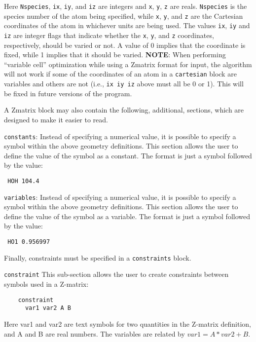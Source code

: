\begin{description}
Here \texttt{Nspecies}, \texttt{ix}, \texttt{iy}, and \texttt{iz} are
integers and \texttt{x}, \texttt{y}, \texttt{z} are
reals. \texttt{Nspecies} is the species number of the atom being
specified, while \texttt{x}, \texttt{y}, and \texttt{z} are the
Cartesian coordinates of the atom in whichever units are being
used. The values \texttt{ix}, \texttt{iy} and \texttt{iz} are integer
flags that indicate whether the \texttt{x}, \texttt{y}, and \texttt{z}
coordinates, respectively, should be varied or not. A value of 0
implies that the coordinate is fixed, while 1 implies that it should
be varied.  \textbf{NOTE}: When performing ``variable cell''
optimization while using a Zmatrix format for input, the algorithm
will not work if some of the coordinates of an atom in a
\texttt{cartesian} block are variables and others are not (i.e.,
\texttt{ix iy iz} above must all be 0 or 1). This will be fixed in
future versions of the program.

A Zmatrix block may also contain the following, additional, sections, which
are designed to make it easier to read.

\item \texttt{constants}: Instead of specifying a numerical value, it
  is possible to specify a symbol within the above geometry
  definitions. This section allows the user to define the value of the
  symbol as a constant. The format is just a symbol followed by the
  value:

\noindent\texttt{      HOH 104.4}

\item \texttt{variables}: Instead of specifying a numerical value, it
  is possible to specify a symbol within the above geometry
  definitions. This section allows the user to define the value of the
  symbol as a variable. The format is just a symbol followed by the
  value:

\noindent\texttt{      HO1 0.956997}

Finally, constraints must be specified in a \texttt{constraints} block.

\item \texttt{constraint} This sub-section allows the user to create
  constraints between symbols used in a Z-matrix:
\begin{verbatim}
    constraint
      var1 var2 A B
\end{verbatim}
Here var1 and var2 are text symbols for two quantities in the Z-matrix
definition, and A and B are real numbers. The variables are related by
$var1 = A*var2 + B$.


\end{description}
